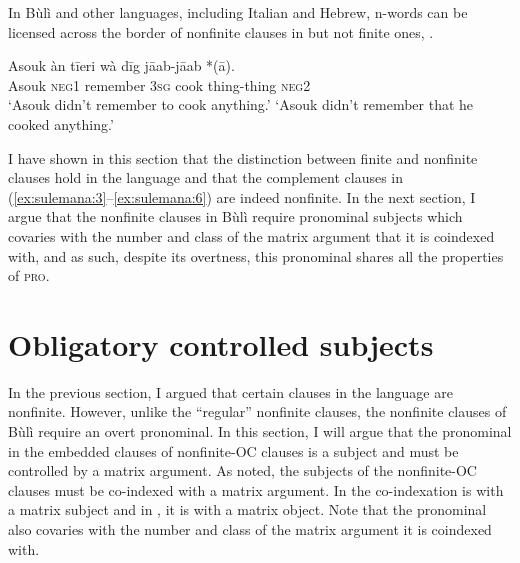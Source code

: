 \documentclass[output=paper,colorlinks,citecolor=brown]{langscibook}
\begin{document}
In Bùlì and other languages, including Italian and Hebrew, n-words can be licensed across the border of nonfinite clauses in but not finite ones, . 

\ea%
    \label{ex:sulemana:15}
    \ea%
    \label{ex:sulemana:15a}
    \gll    Asouk àn tīeri  wà dīg jāab-jāab  *(ā).\\
            Asouk  \textsc{neg1}  remember \textsc{3sg} cook thing-thing  \textsc{neg2} \\
    \glt    `Asouk didn't remember to cook anything.'
    \glt    `Asouk didn't remember that he cooked anything.' 
    \z
\z

I have shown in this section that the distinction between finite and nonfinite clauses hold in the language and that the complement clauses in (\ref{ex:sulemana:3}--\ref{ex:sulemana:6})  are indeed nonfinite. 
In the next section, I  argue that the nonfinite clauses in Bùlì require pronominal subjects which covaries with the number and class of the matrix argument that it is coindexed with, and as such, despite its overtness, this pronominal shares all the properties of \textsc{pro}. 

\section{Obligatory controlled subjects}\label{sec:sulemana:4}

In the previous section, I argued that certain clauses in the language are nonfinite. However, unlike the ``regular'' nonfinite clauses, the nonfinite clauses of Bùlì require an overt pronominal. In this section, I will argue that the pronominal in the embedded clauses of nonfinite-OC clauses is a subject and must be controlled by a matrix argument.  As noted, the subjects of the nonfinite-OC clauses must be co-indexed with a matrix argument. In  the co-indexation is with a matrix subject and in , it is with a matrix object. Note that the pronominal also covaries with the number and class of the matrix argument it is coindexed with. 
\end{document}
